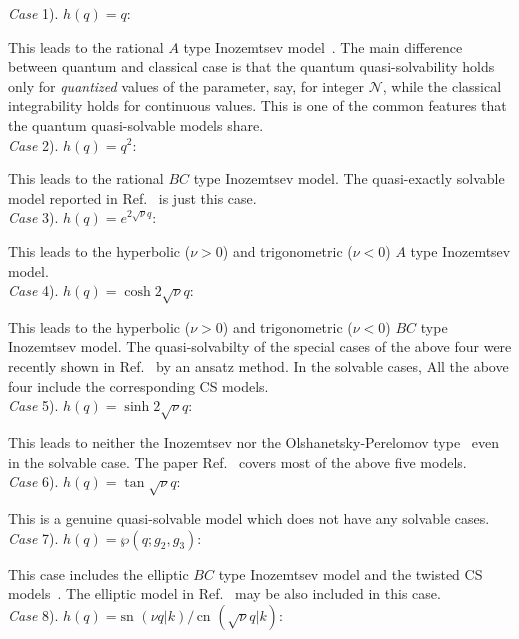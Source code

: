 \documentclass[a4paper,preprint,amsfonts,amssymb,amsmath,%
tightenlines,nofootinbib,noshowpacs]{revtex4}
\newcommand{\cN}{\mathcal{N}}
\newcommand{\rnu}{\sqrt{\nu}}
\begin{document}
\noindent
\textit{Case} 1). $h(q)=q$:

This leads to the rational $A$ type Inozemtsev
model~\cite{Inoze1,InMe1,Inoze3}.
The main difference between quantum and classical case is that the
quantum quasi-solvability holds only for \textit{quantized} values
of the parameter, say, for integer $\cN$, while the classical
integrability holds for continuous values. This is one of the common
features that the quantum quasi-solvable models share.\\

\noindent
\textit{Case} 2). $h(q)=q^{2}$:

This leads to the rational $BC$ type Inozemtsev model.
The quasi-exactly solvable model reported in Ref.~\cite{HoSh1} is
just this case.\\

\noindent
\textit{Case} 3). $h(q)=e^{2\rnu q}$:

This leads to the hyperbolic ($\nu >0$) and
trigonometric ($\nu <0$) $A$ type Inozemtsev model.\\

\noindent
\textit{Case} 4). $h(q)=\cosh 2\rnu q$:

This leads to the hyperbolic ($\nu >0$) and
trigonometric ($\nu <0$) $BC$ type Inozemtsev model.
The quasi-solvabilty of the special cases of the above four
were recently shown in Ref.~\cite{SaTa1} by an ansatz method.
In the solvable cases, All the above four include the corresponding
CS models.\\

\noindent
\textit{Case} 5). $h(q)=\sinh 2\rnu q$:

This leads to neither the Inozemtsev nor the Olshanetsky-Perelomov
type~\cite{OlPe2} even in the solvable case.
The paper Ref.~\cite{UlLoRo1} covers most of the above five models.\\

\noindent
\textit{Case} 6). $h(q)=\tan\rnu q$:

This is a genuine quasi-solvable model which does not have
any solvable cases.\\

\noindent
\textit{Case} 7). $h(q)=\wp(q;g_{2},g_{3})$:

This case includes the elliptic $BC$ type Inozemtsev model and the
twisted CS models~\cite{HoPh1,HoPh2,BoSa1}. The elliptic model in
Ref.~\cite{UlLoRo2} may be also included in this case.\\

\noindent
\textit{Case} 8). $h(q)=\text{sn }(\nu q|k)/\,\text{cn }(\rnu q|k)$:
\end{document}
